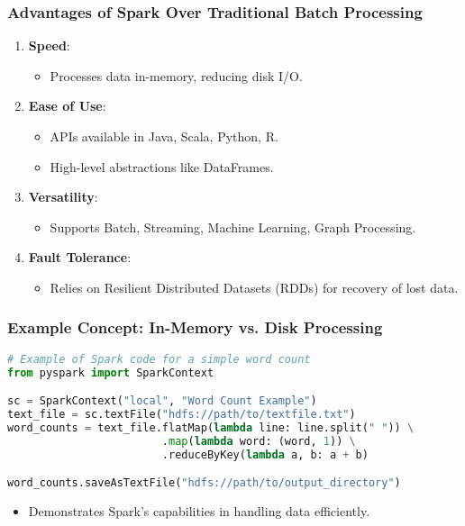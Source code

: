 \documentclass[aspectratio=169]{beamer}
\begin{document}
\begin{frame}
  \frametitle{Advantages of Spark Over Traditional Batch Processing}
  \begin{enumerate}
    \item \textbf{Speed}:
      \begin{itemize}
        \item Processes data in-memory, reducing disk I/O.
      \end{itemize}
    \item \textbf{Ease of Use}:
      \begin{itemize}
        \item APIs available in Java, Scala, Python, R.
        \item High-level abstractions like DataFrames.
      \end{itemize}
    \item \textbf{Versatility}:
      \begin{itemize}
        \item Supports Batch, Streaming, Machine Learning, Graph Processing.
      \end{itemize}
    \item \textbf{Fault Tolerance}:
      \begin{itemize}
        \item Relies on Resilient Distributed Datasets (RDDs) for recovery of lost data.
      \end{itemize}
  \end{enumerate}
\end{frame}

\begin{frame}[fragile]
  \frametitle{Example Concept: In-Memory vs. Disk Processing}
  \begin{lstlisting}[language=Python]
# Example of Spark code for a simple word count
from pyspark import SparkContext

sc = SparkContext("local", "Word Count Example")
text_file = sc.textFile("hdfs://path/to/textfile.txt")
word_counts = text_file.flatMap(lambda line: line.split(" ")) \
                        .map(lambda word: (word, 1)) \
                        .reduceByKey(lambda a, b: a + b)

word_counts.saveAsTextFile("hdfs://path/to/output_directory")
  \end{lstlisting}
  \begin{itemize}
    \item Demonstrates Spark's capabilities in handling data efficiently.
  \end{itemize}
\end{frame}
\end{document}
